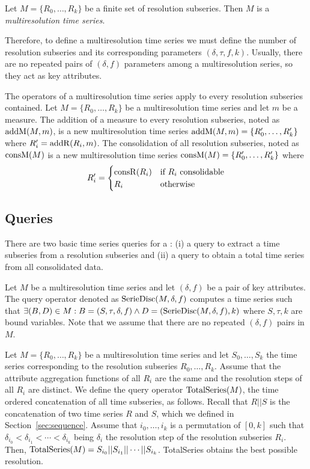 \begin{definition}
  Let $M=\{R_0, \dots, R_k\}$ be a finite set of resolution
  subseries. Then $M$ is a \emph{multiresolution time series}.
\end{definition}

Therefore, to define a multiresolution time series we must define the
number of resolution subseries and its corresponding parameters
$(\delta,\tau,f,k)$.  Usually, there are no repeated pairs of
$(\delta,f)$ parameters among a multiresolution series, so they act as
key attributes.

The operators of a multiresolution time series apply to every
resolution subseries contained. Let
$M=\{R_0,\allowbreak\dots,\allowbreak R_k\}$ be a multiresolution time
series and let $m$ be a measure. The addition of a measure to every
resolution subseries, noted as $\operatorname{addM}(M,m)$, is a new multiresolution
time series $\operatorname{addM}(M,m)=\{R'_0, \dots,\allowbreak R'_k\}$ where
$R'_i=\operatorname{addR}(R_i,m)$. The consolidation of all resolution subseries,
noted as $\operatorname{consM}(M)$ is a new multiresolution time series
$\operatorname{consM}(M)=\{R'_0,\allowbreak\dots,\allowbreak R'_k\}$ where
\[R'_i=
\begin{cases}
\operatorname{consR}(R_i) & \text{if } R_i \text{ consolidable}\\
 R_i & \text{otherwise}
\end{cases}
\]


\subsection{Queries}

There are two basic time series queries for a : (i) a
query to extract a time subseries from a resolution subseries and (ii)
a query to obtain a total time series from all consolidated data.

Let $M$ be a multiresolution time series and let $(\delta,f)$ be a
pair of key attributes.  The query operator denoted as
$\operatorname{SerieDisc}(M,\delta,f)$ computes a time series such that $\exists
(B,D) \in M: B=(S,\tau,\delta,f) \wedge D=(\operatorname{SerieDisc}(M,\delta,f), k)
$ where $S,\tau,k$ are bound variables.  Note that we assume that
there are no repeated $(\delta,f)$ pairs in $M$.

Let $M=\{R_0,\dots,R_k\}$ be a multiresolution time series and let
$S_0, \dots, S_k$ the time series corresponding to the resolution
subseries $R_0,\dots,R_k$. Assume that the attribute aggregation
functions of all $R_i$ are the same and the resolution steps of all
$R_i$ are distinct. We define the query operator $\operatorname{TotalSeries}(M)$,
the time ordered concatenation of all time subseries, as
follows. Recall that $R||S$ is the concatenation of two time series
$R$ and $S$, which we defined in Section~\ref{sec:sequence}. Assume
that $i_0,\dots,i_k$ is a permutation of $[0,k]$ such that
$\delta_{i_0} < \delta_{i_1} < \cdots < \delta_{i_k}$ being $\delta_i$
the resolution step of the resolution subseries $R_i$. Then,
$\operatorname{TotalSeries}(M) = S_{i_0} || S_{i_1} || \cdots ||
S_{i_k}$. TotalSeries obtains the best possible resolution.

